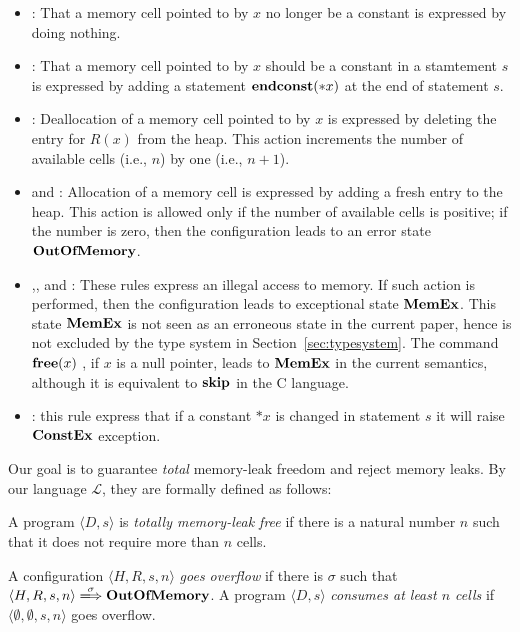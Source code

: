 \begin{itemize}
\item {}: That a memory cell pointed to by \(x\) no
  longer be a constant is expressed by doing nothing.
\item {}: That a memory cell pointed to by \(x\) should
  be a constant in a stamtement \(s\) is expressed by adding a
  statement \(\mathbf{endconst}(*x)\) at the end of statement \(s\).
\item {}: Deallocation of a memory cell pointed to by \(x\)
  is expressed by deleting the entry for \(R(x)\) from the heap.  This
  action increments the number of available cells (i.e., \(n\)) by one
  (i.e., \(n+1\)).
\item {} and : Allocation of a memory
  cell is expressed by adding a fresh entry to the heap.  This action is
  allowed only if the number of available cells is positive; if the
  number is zero, then the configuration leads to an error state
  \(\mathbf{OutOfMemory}\).
\item {},, and
   : These rules express an illegal access to memory.
  If such action is performed, then the configuration leads to
  exceptional state \(\mathbf{MemEx}\).  This state \(\mathbf{MemEx}\) is not seen as
  an erroneous state in the current paper, hence is not excluded by
  the type system in Section~\ref{sec:typesystem}.  The command
  \(\mathbf{free}(x)\;\), if \(x\) is a null pointer, leads to \(\mathbf{MemEx}\) in the
  current semantics, although it is equivalent to \(\mathbf{skip}\) in the C
  language.
\item {}: this rule express that if a constant \(*x\)
  is changed in statement \(s\) it will raise \(\mathbf{ConstEx}\) exception.
\end{itemize}

Our goal is to guarantee \emph{total} memory-leak freedom and reject
memory leaks. By our language \(\mathcal{L}\), they are formally
defined as follows:
\begin{myDef}
\label{df:ml}
A program \(\langle D, s \rangle\) is \emph{totally memory-leak free}
if there is a natural number \(n\) such that it does not require more
than \(n\) cells.
\end{myDef}
\begin{myDef}
\label{df:ml}
A configuration \(\langle H, R, s, n \rangle\) \emph{goes overflow} if
there is \(\sigma\) such that \(\langle H, R, s, n \rangle
\xLongrightarrow{\sigma} \OVERFLOW\).  A program \(\langle D, s
\rangle\) \emph{consumes at least \(n\) cells} if \(\langle \emptyset,
\emptyset, s, n \rangle\) goes overflow.  
\end{myDef}



